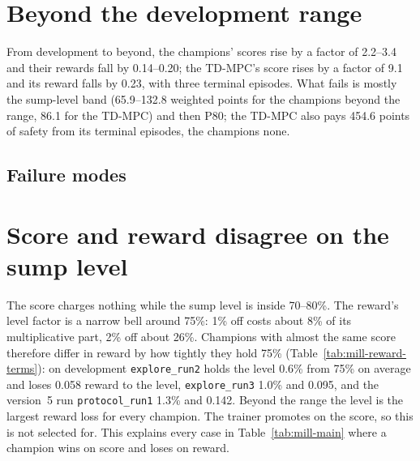 \section{Beyond the development range}
\label{sec:mill-beyond}
From development to beyond, the champions' scores rise by a factor of
2.2--3.4 and their rewards fall by 0.14--0.20; the TD-MPC's score rises by a
factor of 9.1 and its reward falls by 0.23, with three terminal episodes. What
fails is mostly the sump-level band (65.9--132.8 weighted points for the
champions beyond the range, 86.1 for the TD-MPC) and then P80; the TD-MPC also
pays 454.6 points of safety from its terminal episodes, the champions none.

\subsection{Failure modes}
\label{sec:mill-failure-modes}

\section{Score and reward disagree on the sump level}
\label{sec:mill-reward}
The score charges nothing while the sump level is inside 70--80\%. The
reward's level factor is a narrow bell around 75\%: 1\% off costs about 8\% of
its multiplicative part, 2\% off about 26\%. Champions with almost the same
score therefore differ in reward by how tightly they hold 75\%
(Table~\ref{tab:mill-reward-terms}): on development \texttt{explore\_run2}
holds the level 0.6\% from 75\% on average and loses 0.058 reward to the level,
\texttt{explore\_run3} 1.0\% and 0.095, and the version~5 run
\texttt{protocol\_run1} 1.3\% and 0.142. Beyond the range the level is the
largest reward loss for every champion. The trainer promotes on the score, so
this is not selected for. This explains every case in
Table~\ref{tab:mill-main} where a champion wins on score and loses on reward.

